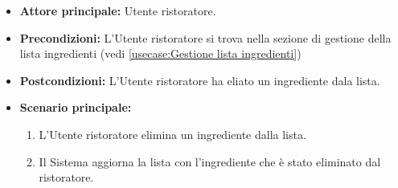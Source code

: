 \label{usecase:Elimina ingrediente}
\begin{itemize}

	\item \textbf{Attore principale:} Utente ristoratore.

	\item \textbf{Precondizioni:} L'Utente ristoratore si trova nella sezione di gestione della lista ingredienti (vedi \autoref{usecase:Gestione lista ingredienti})

	\item \textbf{Postcondizioni:} L'Utente ristoratore ha eliato un ingrediente dala lista.

	\item \textbf{Scenario principale:}
	\begin{enumerate}
		\item L'Utente ristoratore elimina un ingrediente dalla lista.
		\item Il Sistema aggiorna la lista con l'ingrediente che è stato eliminato dal ristoratore.
	\end{enumerate}

\end{itemize}
